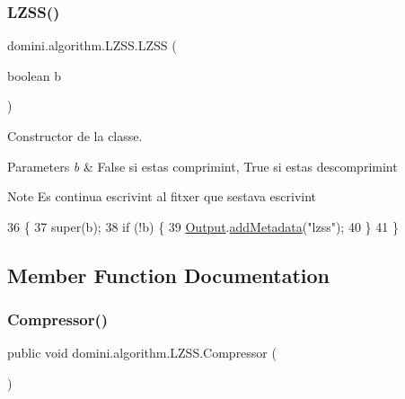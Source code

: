 \subsubsection{\texorpdfstring{L\+Z\+S\+S()}{LZSS()}\hspace{0.1cm}{\footnotesize\ttfamily [2/2]}}
{\footnotesize\ttfamily domini.\+algorithm.\+L\+Z\+S\+S.\+L\+Z\+SS (\begin{DoxyParamCaption}\item[{boolean}]{b }\end{DoxyParamCaption})\hspace{0.3cm}{\ttfamily [inline]}}



Constructor de la classe. 


\begin{DoxyParams}{Parameters}
{\em b} & False si estas comprimint, True si estas descomprimint \\
\hline
\end{DoxyParams}
\begin{DoxyNote}{Note}
Es continua escrivint al fitxer que s\textquotesingle{}estava escrivint 
\end{DoxyNote}

\begin{DoxyCode}
36                            \{
37         super(b);
38         \textcolor{keywordflow}{if} (!b) \{
39             \hyperlink{classdomini_1_1algorithm_1_1Algorithm_a4de9955411c656325adc391ef570c082}{Output}.\hyperlink{classpersistencia_1_1output_1_1Ctrl__Output_ae6d6857910a023982900ddc857b891f0}{addMetadata}(\textcolor{stringliteral}{"lzss"});
40         \}
41     \}
\end{DoxyCode}


\subsection{Member Function Documentation}
\mbox{\label{classdomini_1_1algorithm_1_1LZSS_a047f2460b8461cdb044604dd639326a3}} 
\subsubsection{\texorpdfstring{Compressor()}{Compressor()}}
{\footnotesize\ttfamily public void domini.\+algorithm.\+L\+Z\+S\+S.\+Compressor (\begin{DoxyParamCaption}{ }\end{DoxyParamCaption})\hspace{0.3cm}{\ttfamily [inline]}}



